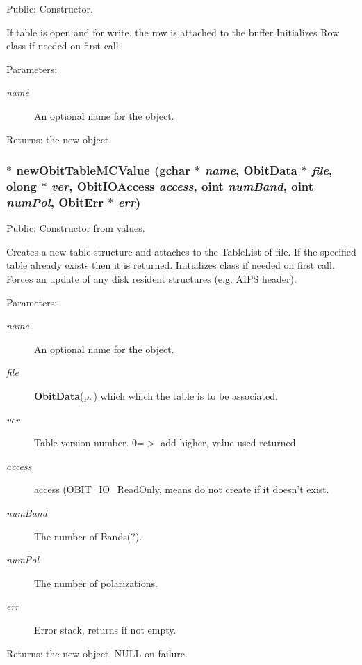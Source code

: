 Public: Constructor. 

If table is open and for write, the row is attached to the buffer Initializes Row class if needed on first call. \begin{Desc}
\item[Parameters:]
\begin{description}
\item[{\em name}]An optional name for the object. \end{description}
\end{Desc}
\begin{Desc}
\item[Returns:]the new object. \end{Desc}
\subsubsection{$\ast$ new\-Obit\-Table\-MCValue (gchar $\ast$ {\em name}, {\bf Obit\-Data} $\ast$ {\em file}, {\bf olong} $\ast$ {\em ver}, Obit\-IOAccess {\em access}, {\bf oint} {\em num\-Band}, {\bf oint} {\em num\-Pol}, {\bf Obit\-Err} $\ast$ {\em err})}\label{ObitTableMC_8h_a12}


Public: Constructor from values. 

Creates a new table structure and attaches to the Table\-List of file. If the specified table already exists then it is returned. Initializes class if needed on first call. Forces an update of any disk resident structures (e.g. AIPS header). \begin{Desc}
\item[Parameters:]
\begin{description}
\item[{\em name}]An optional name for the object. \item[{\em file}]{\bf Obit\-Data}{\rm (p.\,\pageref{structObitData})} which which the table is to be associated. \item[{\em ver}]Table version number. 0=$>$ add higher, value used returned \item[{\em access}]access (OBIT\_\-IO\_\-Read\-Only, means do not create if it doesn't exist. \item[{\em num\-Band}]The number of Bands(?). \item[{\em num\-Pol}]The number of polarizations. \item[{\em err}]Error stack, returns if not empty. \end{description}
\end{Desc}
\begin{Desc}
\item[Returns:]the new object, NULL on failure. \end{Desc}
